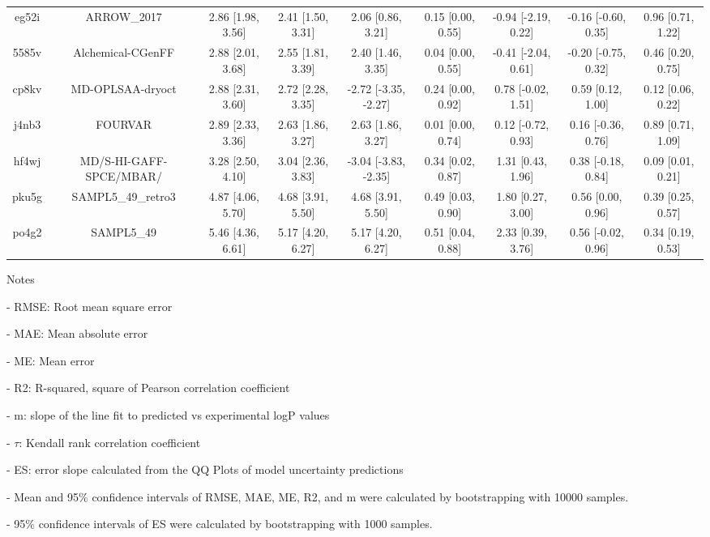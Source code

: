 \documentclass{article}
\begin{document}
\begin{center}
\begin{longtable}{|ccccccccc|}
 eg52i &                                        ARROW\_2017 &  2.86 [1.98, 3.56] &  2.41 [1.50, 3.31] &     2.06 [0.86, 3.21] &  0.15 [0.00, 0.55] &  -0.94 [-2.19, 0.22] &  -0.16 [-0.60, 0.35] &     0.96 [0.71, 1.22] \\
 5585v &                                  Alchemical-CGenFF &  2.88 [2.01, 3.68] &  2.55 [1.81, 3.39] &     2.40 [1.46, 3.35] &  0.04 [0.00, 0.55] &  -0.41 [-2.04, 0.61] &  -0.20 [-0.75, 0.32] &     0.46 [0.20, 0.75] \\
 cp8kv &                                   MD-OPLSAA-dryoct &  2.88 [2.31, 3.60] &  2.72 [2.28, 3.35] &  -2.72 [-3.35, -2.27] &  0.24 [0.00, 0.92] &   0.78 [-0.02, 1.51] &    0.59 [0.12, 1.00] &     0.12 [0.06, 0.22] \\
 j4nb3 &                                            FOURVAR &  2.89 [2.33, 3.36] &  2.63 [1.86, 3.27] &     2.63 [1.86, 3.27] &  0.01 [0.00, 0.74] &   0.12 [-0.72, 0.93] &   0.16 [-0.36, 0.76] &     0.89 [0.71, 1.09] \\
 hf4wj &                            MD/S-HI-GAFF-SPCE/MBAR/ &  3.28 [2.50, 4.10] &  3.04 [2.36, 3.83] &  -3.04 [-3.83, -2.35] &  0.34 [0.02, 0.87] &    1.31 [0.43, 1.96] &   0.38 [-0.18, 0.84] &     0.09 [0.01, 0.21] \\
 pku5g &                                 SAMPL5\_49\_retro3 &  4.87 [4.06, 5.70] &  4.68 [3.91, 5.50] &     4.68 [3.91, 5.50] &  0.49 [0.03, 0.90] &    1.80 [0.27, 3.00] &    0.56 [0.00, 0.96] &     0.39 [0.25, 0.57] \\
 po4g2 &                                         SAMPL5\_49 &  5.46 [4.36, 6.61] &  5.17 [4.20, 6.27] &     5.17 [4.20, 6.27] &  0.51 [0.04, 0.88] &    2.33 [0.39, 3.76] &   0.56 [-0.02, 0.96] &     0.34 [0.19, 0.53] \\
\end{longtable}
\end{center}

Notes

- RMSE: Root mean square error

- MAE: Mean absolute error

- ME: Mean error

- R2: R-squared, square of Pearson correlation coefficient

- m: slope of the line fit to predicted vs experimental logP values

- $\tau$:  Kendall rank correlation coefficient

- ES: error slope calculated from the QQ Plots of model uncertainty predictions

- Mean and 95\% confidence intervals of RMSE, MAE, ME, R2, and m were calculated by bootstrapping with 10000 samples.

- 95\% confidence intervals of ES were calculated by bootstrapping with 1000 samples.\end{document}
\end{document}

